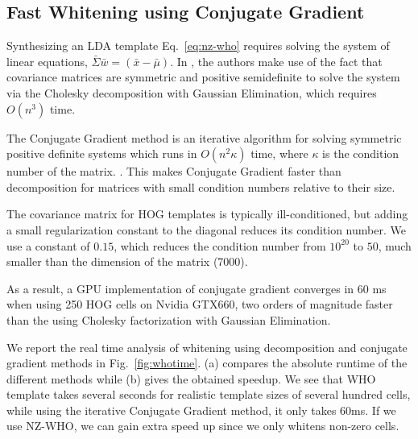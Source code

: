 \subsection{Fast Whitening using Conjugate Gradient}
\label{sec:fastwhiten}

Synthesizing an LDA template Eq.~\ref{eq:nz-who} requires solving the system of
linear equations, $\bar{\Sigma} \bar{w} = (\bar{x} - \bar{\mu})$. In
\cite{Hariharan12}, the authors make use of the fact that covariance matrices
are symmetric and positive semidefinite to solve the system via the Cholesky
decomposition with Gaussian Elimination, which requires $O(n^3)$ time.

The Conjugate Gradient method is an iterative algorithm for solving symmetric
positive definite systems which runs in $O(n^2\kappa)$ time, where $\kappa$ is
the condition number of the matrix. \cite{Shewchuk94}.
%
This makes Conjugate Gradient faster than decomposition for matrices with small
condition numbers relative to their size.

The covariance matrix for HOG templates is typically
ill-conditioned\cite{Hariharan12}, but adding a small regularization constant to
the diagonal reduces its condition number.
We use a constant of $0.15$, which reduces the condition number from $10^{20}$
to $50$, much smaller than the dimension of the matrix (7000).

As a result, a GPU implementation of conjugate gradient converges in 60
ms when using 250 HOG cells on Nvidia GTX660, two orders of magnitude faster
than the using Cholesky factorization with Gaussian Elimination.

We report the real time analysis of whitening using decomposition and
conjugate gradient methods in Fig.~\ref{fig:whotime}. (a) compares the
absolute runtime of the different methods while (b) gives the obtained
speedup. We see that %
WHO template takes several seconds for realistic template sizes of
several hundred cells, while using the iterative Conjugate Gradient
method, it only takes 60ms. If we use NZ-WHO, we can gain extra speed
up since we only whitens non-zero cells.

